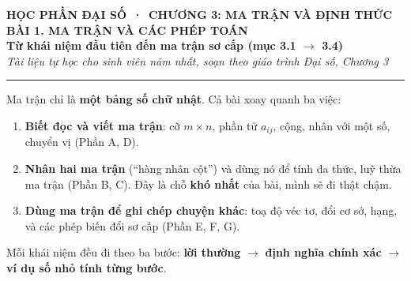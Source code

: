 \documentclass[11pt, a4paper, twoside]{article}
\newcommand{\tacgia}{Nhật Thịnh - N26DCCN273}
\begin{document}
\noindent
{}

\vspace{0.7cm}

\begin{center}
  {\small\bfseries\color{maincolor} HỌC PHẦN ĐẠI SỐ \,·\, CHƯƠNG 3: MA TRẬN VÀ ĐỊNH THỨC}\\[4pt]
  {\Large\bfseries\color{maincolor} BÀI 1. MA TRẬN VÀ CÁC PHÉP TOÁN}\\[2pt]
  {\large\bfseries\color{maincolor!80!black} Từ khái niệm đầu tiên đến ma trận sơ cấp (mục 3.1 $\to$ 3.4)}\\[4pt]
  {\small\itshape Tài liệu tự học cho sinh viên năm nhất, soạn theo giáo trình Đại số, Chương 3}
\end{center}

\vspace{0.3cm}
{\color{maincolor}\rule{\textwidth}{1.2pt}}
\vspace{0.1cm}

\begin{hy}
Ma trận chỉ là \textbf{một bảng số chữ nhật}. Cả bài xoay quanh ba việc:
\begin{enumerate}[label=\textbf{(\arabic*)}, leftmargin=*, itemsep=1pt, topsep=2pt]
  \item \textbf{Biết đọc và viết ma trận}: cỡ $m\times n$, phần tử $a_{ij}$, cộng, nhân với một số, chuyển vị (Phần A, D).
  \item \textbf{Nhân hai ma trận} (``hàng nhân cột'') và dùng nó để tính đa thức, luỹ thừa ma trận (Phần B, C). Đây là chỗ \textbf{khó nhất} của bài, mình sẽ đi thật chậm.
  \item \textbf{Dùng ma trận để ghi chép chuyện khác}: toạ độ véc tơ, đổi cơ sở, hạng, và các phép biến đổi sơ cấp (Phần E, F, G).
\end{enumerate}
Mỗi khái niệm đều đi theo ba bước: \textbf{lời thường} $\to$ \textbf{định nghĩa chính xác} $\to$ \textbf{ví dụ số nhỏ tính từng bước}.
\end{hy}
\end{document}
